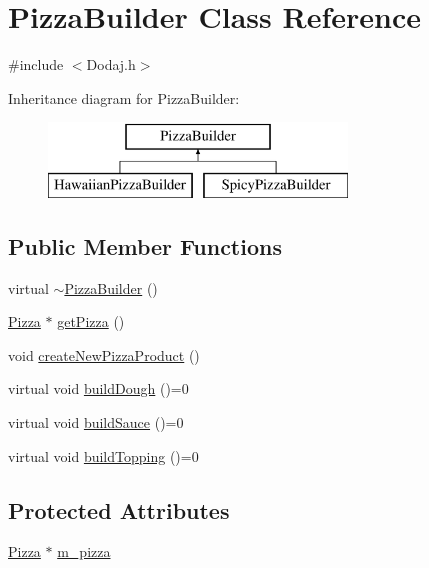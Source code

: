 \hypertarget{class_pizza_builder}{\section{Pizza\-Builder Class Reference}
\label{class_pizza_builder}
}


{\ttfamily \#include $<$Dodaj.\-h$>$}

Inheritance diagram for Pizza\-Builder\-:\begin{figure}[H]
\begin{center}
\leavevmode
\includegraphics[height=2.000000cm]{class_pizza_builder}
\end{center}
\end{figure}
\subsection*{Public Member Functions}
\begin{DoxyCompactItemize}
\item 
virtual \hyperlink{class_pizza_builder_a424dc27395e06a4c38beca703c91c258}{$\sim$\-Pizza\-Builder} ()
\item 
\hyperlink{class_pizza}{Pizza} $\ast$ \hyperlink{class_pizza_builder_a95ce87757351da71ab03f400802a0d1a}{get\-Pizza} ()
\item 
void \hyperlink{class_pizza_builder_ad321d7aede0131b349c6853768ea1735}{create\-New\-Pizza\-Product} ()
\item 
virtual void \hyperlink{class_pizza_builder_ab779fb4306ae03b3d82690f5939aaf22}{build\-Dough} ()=0
\item 
virtual void \hyperlink{class_pizza_builder_a87b3cc72715e7775c8b36e610e8bb389}{build\-Sauce} ()=0
\item 
virtual void \hyperlink{class_pizza_builder_a46ff797a62789eca327a9ffab95b1b23}{build\-Topping} ()=0
\end{DoxyCompactItemize}
\subsection*{Protected Attributes}
\begin{DoxyCompactItemize}
\item 
\hyperlink{class_pizza}{Pizza} $\ast$ \hyperlink{class_pizza_builder_a095c1999e588b9db2d4fcec6e050e3a2}{m\-\_\-pizza}
\end{DoxyCompactItemize}


